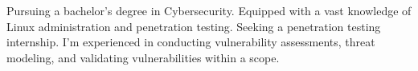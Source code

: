 \documentclass[letter,10pt]{article}
\begin{document}
 Pursuing a bachelor’s degree in Cybersecurity. Equipped with a vast knowledge of
Linux administration and penetration testing. Seeking a penetration testing internship. I'm experienced in conducting vulnerability assessments, threat modeling, and validating vulnerabilities within a scope.
\end{document}
